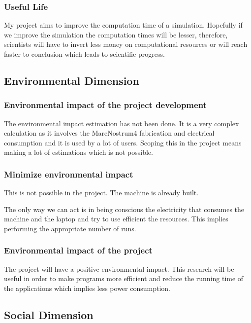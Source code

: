 \subsubsection{Useful Life}
My project aims to improve the computation time of a simulation. Hopefully if we improve the simulation the computation times will be lesser, therefore, scientists will have to invert less money on computational resources or will reach faster to conclusion which leads to scientific progress. 

\subsection{Environmental Dimension}

\subsubsection{Environmental impact of the project development}

The environmental impact estimation has not been done. It is a very complex calculation as it involves the MareNostrum4 fabrication and electrical consumption and it is used by a lot of users. Scoping this in the project means making a lot of estimations which is not possible.

\subsubsection{Minimize environmental impact}

This is not possible in the project. The machine is already built.

The only way we can act is in being conscious the electricity that consumes the machine and the laptop and try to use efficient the resources. This implies performing the appropriate number of runs.

\subsubsection{Environmental impact of the project}

The project will have a positive environmental impact. This research will be useful in order to make programs more efficient and reduce the running time of the applications which implies less power consumption.

\subsection{Social Dimension}

